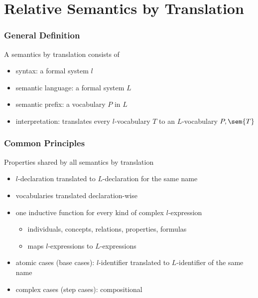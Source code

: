 \section{Relative Semantics by Translation}

\begin{frame}\frametitle{General Definition}
A semantics by translation consists of
\begin{itemize}
 \item syntax: a formal system $l$
 \item semantic language: a formal system $L$
 \item semantic prefix: a vocabulary $P$ in $L$
 \item interpretation: translates every $l$-vocabulary $T$ to an $L$-vocabulary $P,\sem{T}$
\end{itemize}
\end{frame}

\begin{frame}\frametitle{Common Principles}
Properties shared by all semantics by translation
\begin{itemize}
 \item $l$-declaration translated to $L$-declaration for the same name
 \item vocabularies translated declaration-wise
 \item one inductive function for every kind of complex $l$-expression
  \begin{itemize}
   \item individuals, concepts, relations, properties, formulas
   \item maps $l$-expressions to $L$-expressions
  \end{itemize}
 \item atomic cases (base cases): $l$-identifier translated to $L$-identifier of the same name
 \item complex cases (step cases): compositional
\end{itemize}
\end{frame}


